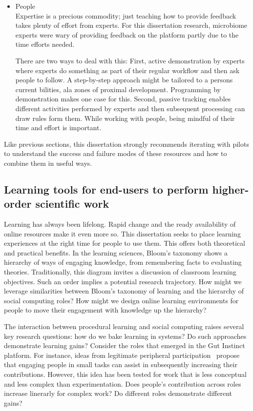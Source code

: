 \begin{itemize}
\item People \\
Expertise is a precious commodity; just teaching how to provide feedback takes plenty of effort from experts. For this dissertation research, microbiome experts were wary of providing feedback on the platform partly due to the time efforts needed. 

There are two ways to deal with this: First, active demonstration by experts where experts do something as part of their regular workflow and then ask people to follow. A step-by-step approach might be tailored to a person\textquotesingle s current bilities, ala zones of proximal development. Programming by demonstration makes one case for this. Second, passive tracking enables different activities performed by experts and then subsequent processing can draw rules form them. While working with people, being mindful of their time and effort is important.
\end{itemize}

Like previous sections, this dissertation strongly recommends iterating with pilots to understand the success and failure modes of these resources and how to combine them in useful ways.

\subsection{Learning tools for end-users to perform higher-order scientific work}
Learning has always been lifelong. Rapid change and the ready availability of online resources make it even more so. This dissertation seeks to place learning experiences at the right time for people to use them. This offers both theoretical and practical benefits. In the learning sciences, Bloom’s taxonomy shows a hierarchy of ways of engaging knowledge, from remembering facts to evaluating theories. Traditionally, this diagram invites a discussion of classroom learning objectives. Such an order implies a potential research trajectory. How might we leverage similarities between Bloom’s taxonomy of learning and the hierarchy of social computing roles? How might we design online learning environments for people to move their engagement with knowledge up the hierarchy? 

The interaction between procedural learning and social computing raises several key research questions: how do we bake learning in systems? Do such approaches demonstrate learning gains? Consider the roles that emerged in the Gut Instinct platform. For instance, ideas from legitimate peripheral participation~\cite{Bryant2005} propose that engaging people in small tasks can assist in subsequently increasing their contributions. However, this idea has been tested for work that is less conceptual and less complex than experimentation. Does people's contribution across roles increase linerarly for complex work? Do different roles demonstrate different gains?

